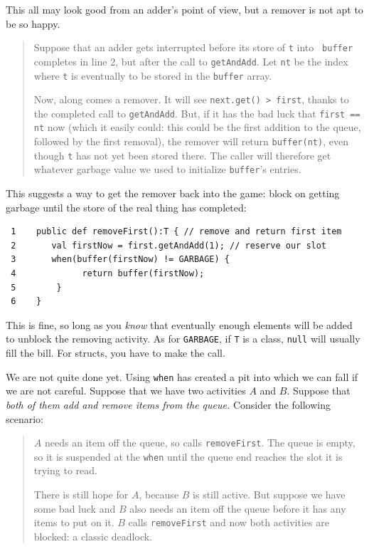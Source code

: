 This all may look good from an adder's point of view, but a remover is not apt
to be so happy.
\begin{quote}
Suppose that an adder gets interrupted before its store of {\tt t} into {\tt
buffer} completes in line 2, but after the call to {\tt getAndAdd}.  Let 
{\tt nt} be the index where {\tt t} is eventually to be stored in the
{\tt buffer} array.

Now, along comes a remover.  It will see {\tt next.get() > first}, thanks to the
completed call to {\tt getAndAdd}.  But, if it has the bad luck that {\tt first
== nt} now (which it easily could: this could be the first addition to the
queue, followed by the first removal), the remover will return 
{\tt buffer(nt)}, even though {\tt t} has not yet been stored there. The caller
will therefore get whatever garbage value we used to initialize {\tt buffer}'s
entries.
\end{quote}

This suggests a way to get the remover back into the game: block on getting
garbage until the store of the real thing has completed:
\begin{verbatim}
 1    public def removeFirst():T { // remove and return first item
 2       val firstNow = first.getAndAdd(1); // reserve our slot
 3       when(buffer(firstNow) != GARBAGE) {
 4             return buffer(firstNow);
 5        }
 6    }
\end{verbatim}
This is fine, so long as you {\em know} that eventually enough elements will be
added to unblock the removing activity.  As for {\tt GARBAGE}, if {\tt T} is a
class, {\tt null} will usually fill the bill.  For structs, you have to make
the call.

We are not quite done yet.  Using {\tt when} has created a pit into which we can
fall if we are not careful.  Suppose that we have two activities $A$ and $B$. 
Suppose that {\em both of them add and remove items from the queue.}  Consider
the following scenario:

\begin{quote}
$A$ needs an item off the queue, so calls {\tt removeFirst}.  The queue is empty,
so it is suspended at the {\tt when} until the queue end reaches the slot it is
trying to read.

There is still hope for $A$, because $B$ is still active.  But suppose we have
some bad luck and $B$ also needs an item off the queue before it has any items
to put on it.  $B$ calls {\tt removeFirst} and now both activities are blocked:
a classic deadlock.
\end{quote}

